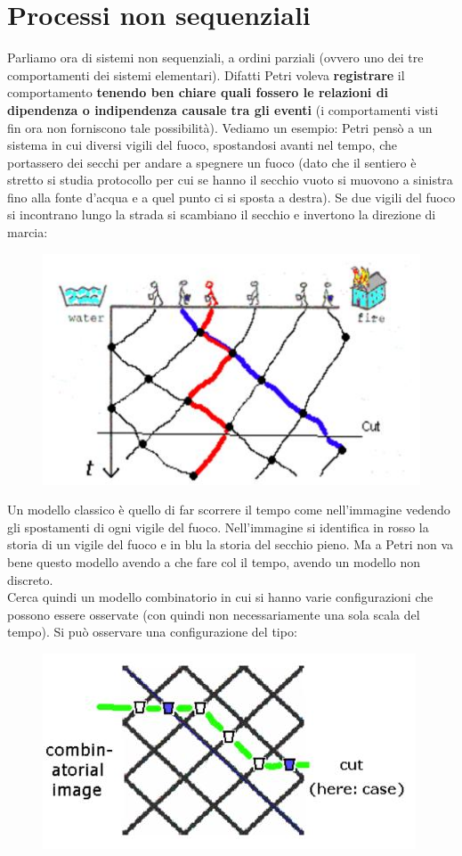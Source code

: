 \section{Processi non sequenziali}
 Parliamo ora di sistemi non sequenziali, a ordini parziali (ovvero uno dei tre comportamenti dei sistemi elementari). Difatti Petri voleva \textbf{registrare} il comportamento \textbf{tenendo ben chiare quali fossero le relazioni di dipendenza o indipendenza causale tra gli eventi} (i comportamenti visti fin ora non forniscono tale possibilità). Vediamo un esempio: Petri pensò a un sistema in cui diversi vigili del fuoco, spostandosi avanti nel tempo, che portassero dei secchi per andare a spegnere un fuoco (dato che il sentiero  è
stretto si studia protocollo per cui se hanno il secchio vuoto si muovono a
sinistra fino alla fonte d'acqua e a quel punto ci si sposta a destra). Se due
vigili del fuoco si incontrano lungo la strada si scambiano 
il secchio e invertono la direzione di marcia:
\begin{figure}[H]
  \centering
  \includegraphics[scale = 0.5]{img/fire.jpg} 
\end{figure}
Un modello classico è quello di far scorrere il tempo come nell'immagine vedendo
gli spostamenti di ogni vigile del fuoco. Nell'immagine si identifica in rosso la storia di
un vigile del fuoco e in blu la storia del secchio pieno.
Ma a Petri non va bene questo modello avendo a che fare col il 
tempo, avendo un modello non discreto.\\
Cerca quindi un modello combinatorio in cui si hanno varie
configurazioni che possono essere osservate (con quindi non necessariamente una
sola scala del tempo).
Si può osservare una configurazione del tipo:
\begin{figure}[H]
  \centering
  \includegraphics[scale = 0.5]{img/fire2.jpg} 
\end{figure}
